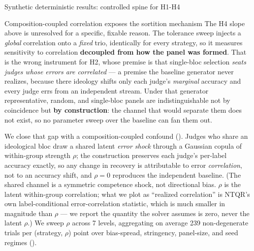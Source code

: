 \documentclass[
  ignorenonframetext,
]{beamer}
\begin{document}
\begin{frame}{Synthetic deterministic results:
controlled spine for H1-H4}
\begin{block}{Composition-coupled correlation exposes the sortition
mechanism}
\protect{}\label{composition-coupled-correlation-exposes-the-sortition-mechanism}
The H4 slope above is unresolved for a specific, fixable reason. The
tolerance sweep injects a \emph{global} correlation onto a \emph{fixed}
trio, identically for every strategy, so it measures sensitivity to
correlation \textbf{decoupled from how the panel was formed}. That is
the wrong instrument for H2, whose premise is that single-bloc selection
\emph{seats judges whose errors are correlated} --- a premise the
baseline generator never realizes, because there ideology shifts only
each judge's \emph{marginal} accuracy and every judge errs from an
independent stream. Under that generator representative, random, and
single-bloc panels are indistinguishable not by coincidence but
\textbf{by construction}: the channel that would separate them does not
exist, so no parameter sweep over the baseline can fan them out.

We close that gap with a composition-coupled confound
(). Judges who share an
ideological bloc draw a shared latent \emph{error shock} through a
Gaussian copula of within-group strength \(\rho\); the construction
preserves each judge's per-label accuracy exactly, so any change in
recovery is attributable to error \emph{correlation}, not to an accuracy
shift, and \(\rho=0\) reproduces the independent baseline. (The shared
channel is a symmetric competence shock, not directional bias. \(\rho\)
is the latent within-group correlation; what we plot as ``realized
correlation'' is NTQR's own label-conditional error-correlation
statistic, which is much smaller in magnitude than \(\rho\) --- we
report the quantity the solver assumes is zero, never the latent
\(\rho\).) We sweep \(\rho\) across 7 levels, aggregating on average 239
non-degenerate trials per (strategy, \(\rho\)) point over bias-spread,
stringency, panel-size, and seed regimes ().


\end{block}
\end{frame}
\end{document}
